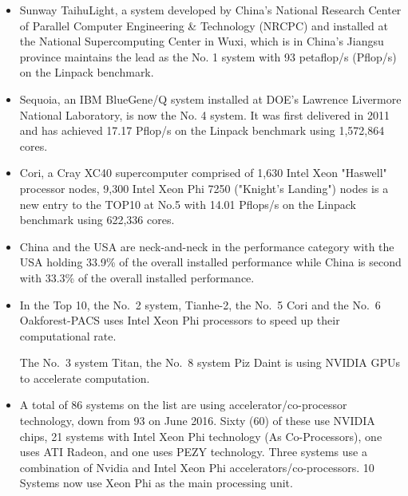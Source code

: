 \documentclass[12pt]{article}
\begin{document}
\begin{itemize}
\item Sunway TaihuLight, a system developed by China’s National Research Center of Parallel Computer Engineering \& Technology (NRCPC) and installed at the National Supercomputing Center in Wuxi, which is in China's Jiangsu province maintains the lead as the No. 1 system with 93 petaflop/s (Pflop/s) on the Linpack benchmark.

\item Sequoia, an IBM BlueGene/Q system installed at DOE’s Lawrence Livermore National Laboratory, is now the No. 4 system. It was first delivered in 2011 and has achieved 17.17 Pflop/s on the Linpack benchmark using 1,572,864 cores.


\item Cori, a Cray XC40 supercomputer comprised of 1,630 Intel Xeon "Haswell" processor nodes, 9,300 Intel Xeon Phi 7250 ("Knight's Landing") nodes is a new entry to the TOP10 at No.5 with 14.01 Pflops/s  on the Linpack benchmark using 622,336 cores.

\item China and the USA are neck-and-neck in the performance category with the USA holding 33.9\% of the overall installed performance while China is second with 33.3\% of the overall installed performance.

\item In the Top 10, the No.\ 2 system, Tianhe-2, the No.\ 5 Cori and the No.\ 6 Oakforest-PACS uses Intel Xeon Phi processors to speed up their computational rate. 

The No.\ 3 system Titan, the No.\ 8 system Piz Daint is using NVIDIA GPUs to accelerate computation.

\item A total of 86 systems on the list are using accelerator/co-processor technology, down from 93 on June 2016. Sixty (60) of these use NVIDIA chips, 21 systems with Intel Xeon Phi technology (As Co-Processors), one uses ATI Radeon, and one uses PEZY technology. Three systems use a combination of Nvidia and Intel Xeon Phi accelerators/co-processors. 10 Systems now use Xeon Phi as the main processing unit.

\end{itemize}
\end{document}
